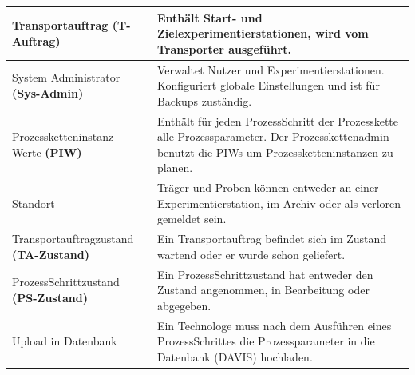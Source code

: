 \documentclass[enabledeprecatedfontcommands,fontsize=12pt,paper=a4,twoside]{scrartcl}
\begin{document}
\begin{longtable}[c]{|p{7cm}|p{8cm}|}
Transportauftrag \textbf{(T-Auftrag)}          & Enthält Start- und Zielexperimentierstationen, wird vom Transporter ausgeführt.                                                                                                                                                                      \\ \hline
System Administrator \textbf{(Sys-Admin)}      & Verwaltet Nutzer und Experimentierstationen. Konfiguriert globale Einstellungen und ist für Backups zuständig.                                                                                                                                         \\ \hline
Prozessketteninstanz Werte \textbf{(PIW)}      & Enthält für jeden ProzessSchritt der Prozesskette alle Prozessparameter. Der Prozesskettenadmin benutzt die PIWs um Prozessketteninstanzen zu planen.                                                                                                 \\ \hline
Standort                                                        & Träger und Proben können entweder an einer Experimentierstation, im Archiv oder als verloren gemeldet sein.                                                                                                                                           \\ \hline
Transportauftragzustand \textbf{(TA-Zustand)}  & Ein Transportauftrag befindet sich im Zustand wartend oder er wurde schon geliefert.                                                                                                                                                                  \\ \hline
ProzessSchrittzustand \textbf{(PS-Zustand)}    & Ein ProzessSchrittzustand hat entweder den Zustand angenommen, in Bearbeitung oder abgegeben.                                                                                                                                                         \\ \hline
Upload in Datenbank                                             & Ein Technologe muss nach dem Ausführen eines ProzessSchrittes die Prozessparameter in die Datenbank (DAVIS) hochladen.                                                                                                                                \\ \hline
\end{longtable}
\end{document}
